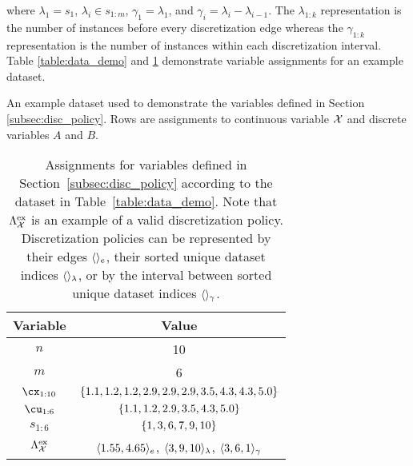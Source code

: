 \noindent
where $\lambda_1 = s_1$, $\lambda_i \in s_{1:m}$, $\gamma_1 = \lambda_1$, and $\gamma_i = \lambda_i - \lambda_{i-1}$.
The $\lambda_{1:k}$ representation is the number of instances before every discretization edge whereas the $\gamma_{1:k}$ representation is the number of instances within each discretization interval. Table \ref{table:data_demo} and \ref{table:data_demo_2} demonstrate variable assignments for an example dataset.


\begin{table}[ht]
  \centering
  \caption{
    An example dataset used to demonstrate the variables defined in Section \ref{subsec:disc_policy}. Rows are assignments to continuous variable $\mathcal{X}$ and discrete variables $A$ and $B$.
  }
  
  \label{table:data_demo}
  \bigskip
  \centering
  \caption{
    Assignments for variables defined in Section~\ref{subsec:disc_policy} according to the dataset in Table~\ref{table:data_demo}.
  	Note that $\Lambda^{\text{ex}}_{\mathcal{X}}$ is an example of a valid discretization policy. Discretization policies can be represented by their edges $\langle  \rangle_{e}$, their sorted unique dataset indices $\langle  \rangle_{\lambda}$, or by the interval between sorted unique dataset indices $\langle  \rangle_{\gamma}$.
  }
	\begin{tabular}{cc}
		\toprule
		Variable &  Value \\
		\midrule
		$n$ &  \num{10} \\
		$m$ &  \num{6} \\
		$\cx_{1:10}$ & $\curly{ 1.1, 1.2, 1.2, 2.9, 2.9, 2.9, 3.5, 4.3, 4.3, 5.0} $\\
		$\cu_{1:6} $ & $\curly{ 1.1,1.2,2.9,3.5,4.3,5.0}$\\
		$s_{1:6}$ & $\curly{1,3,6,7,9,10}$\\
		$\Lambda^{\text{ex}}_{\mathcal{X}}$ & $\langle 1.55,4.65 \rangle_{e}$, $ \langle 3 ,9,10 \rangle_{\lambda}$, $\langle 3, 6, 1 \rangle_{\gamma} $\\
		\bottomrule
	\end{tabular}
  \label{table:data_demo_2}
\end{table}

